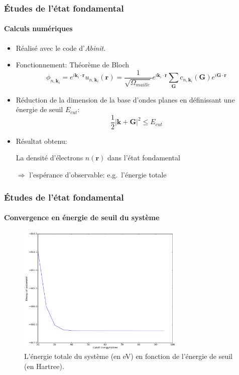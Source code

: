 \documentclass[french]{beamer}
\newcommand{\vb}[1]{\mathbf{#1}}
\begin{document}
\newpage
\begin{frame}
\frametitle{Études de l'état fondamental}
\framesubtitle{Calculs numériques}
\begin{itemize}
  \item Réalisé avec le code d'\textit{Abinit}.
  \item Fonctionnement:
    Théorème de Bloch
    \begin{equation*}
      \phi_{n,\textbf{k}_i}      
      = e^{i\textbf{k}_i\cdot\textbf{r}} u_{n,\textbf{k}_i}(\textbf{r})
      = \frac{1}{\sqrt{\Omega_{maille}}}e^{i\textbf{k}_i\cdot\textbf{r}}\sum_{\textbf{G}} c_{n,\textbf{k}_i}(\textbf{G})e^{i\textbf{G}\cdot\textbf{r}}
    \end{equation*}
  \item Réduction de la dimension de la base d'ondes planes en définissant une énergie de seuil $E_{cut}$:
    \begin{equation*}
      \frac{1}{2}|\textbf{k}+\textbf{G}|^2 \leq E_{cut}
    \end{equation*}

  \item Résultat obtenu:

    La densité d'électrons $n(\vb{r})$ dans l'état fondamental

    $\Rightarrow$ l'espérance d'observable: e.g.\ l'énergie totale

\end{itemize}

\end{frame}

\begin{frame}
\frametitle{Études de l'état fondamental}
\framesubtitle{Convergence en énergie de seuil du système}
\begin{figure}[!h]
    \centering
    \includegraphics[width=8cm]{E_cut}
    \caption{L'énergie totale du système (en eV) en fonction de l'énergie de seuil (en Hartree).}\label{fig-Ecut}
\end{figure}
\end{frame}
\end{document}
